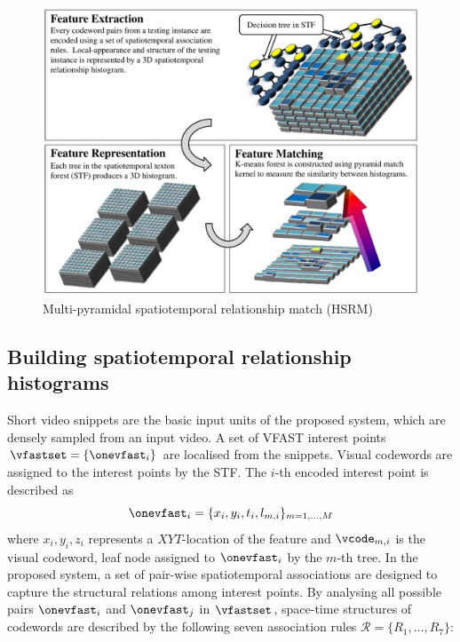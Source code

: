 \begin{figure}[ht]
	\centering	
	\includegraphics[width=0.9\linewidth]{fig/act/fig4_new.pdf} 
	\caption{Multi-pyramidal spatiotemporal relationship match (HSRM)}
	\label{fig/act/hsrm}
\end{figure}

\subsection{Building spatiotemporal relationship histograms}

Short video snippets are the basic input units of the proposed system, which are densely sampled from an input video.  
A set of VFAST interest points $\vfastset = \{\onevfast_{i}\}$ are localised from the snippets. Visual codewords are assigned to the interest points by the STF.   
The $i$-th encoded interest point is described as 
\begin{equation}
	\onevfast_{i} = \{x_i, y_i, t_i, l_{m,i}\}_{m=1,\dots,M}
\end{equation}
where $x_i, y_i, z_i$ represents a $XYT$-location of the feature and $\vcode_{m,i}$ is the visual codeword, \ie leaf node assigned to $\onevfast_{i}$ by the $m$-th tree. 
In the proposed system, a set of pair-wise spatiotemporal associations are designed to capture the structural relations among interest points. By analysing all possible pairs $\onevfast_i$ and $\onevfast_j$ in $\vfastset$, space-time structures of codewords are described by the following seven association rules $\mathcal{R} = \{ R_1,\dots,R_7\}$:


